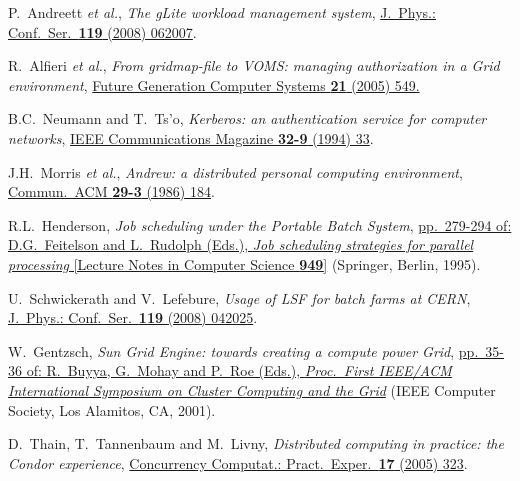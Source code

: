 \documentclass{elsart}
\def\etal {\textit{et al.}}
\begin{document}
\begin{thebibliography}{00}

 P.~Andreett \etal,
\textit{The gLite workload management system},
\href{http://dx.doi.org/10.1088/1742-6596/119/6/062007}
{J.~Phys.: Conf.\ Ser.\ \textbf{119} (2008) 062007}.

 R.~Alfieri \etal,
\textit{From gridmap-file to VOMS: managing authorization in a Grid
environment},
\href{http://dx.doi.org/10.1016/j.future.2004.10.006}
{Future Generation Computer Systems \textbf{21} (2005) 549.}

 B.C.~Neumann and T.~Ts'o,
\textit{Kerberos: an authentication service for computer networks},
\href{http://dx.doi.org/10.1109/35.312841}
{IEEE Communications Magazine \textbf{32-9} (1994) 33}.

 J.H.~Morris \etal,
\textit{Andrew: a distributed personal computing environment},
\href{http://dx.doi.org/10.1145/5666.5671}
{Commun.\ ACM \textbf{29-3} (1986) 184}.

%

 R.L.~Henderson,
\textit{Job scheduling under the Portable Batch System},
\href{http://dx.doi.org/10.1007/3-540-60153-8}
{pp.~279-294 of: D.G.~Feitelson and L.~Rudolph (Eds.),
\textit{Job scheduling strategies for parallel processing}
[Lecture Notes in Computer Science \textbf{949}]} (Springer, Berlin, 1995).

 U.~Schwickerath and V.~Lefebure,
\textit{Usage of LSF for batch farms at CERN},
\href{http://dx.doi.org/10.1088/1742-6596/119/4/042025}
{J.~Phys.: Conf.\ Ser.\ \textbf{119} (2008) 042025}.

 W.~Gentzsch,
\textit{Sun Grid Engine: towards creating a compute power Grid},
\href{http://dx.doi.org/10.1109/CCGRID.2001.923173}
{pp.~35-36 of: R.~Buyya, G.~Mohay and P.~Roe (Eds.),
\textit{Proc.\ First IEEE/ACM International Symposium on Cluster
Computing and the Grid}} (IEEE Computer Society, Los Alamitos, CA, 2001).

 D.~Thain, T.~Tannenbaum and M.~Livny,
\textit{Distributed computing in practice: the Condor experience},
\href{http://dx.doi.org/10.1002/cpe.938}
{Concurrency Computat.: Pract.\ Exper.\ \textbf{17} (2005) 323}.


\end{thebibliography}
\end{document}

